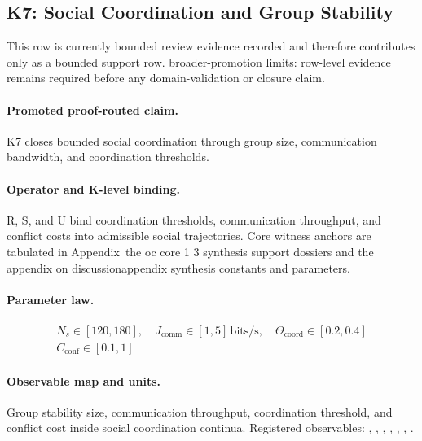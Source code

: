 \subsection{K7: Social Coordination and Group Stability}
\label{sec:oc-core-1-3-synthesis-k7}
This row is currently bounded review evidence recorded and therefore contributes only as a bounded support row.
broader-promotion limits: row-level evidence remains required before any domain-validation or closure claim.

\paragraph{Promoted proof-routed claim.}
K7 closes bounded social coordination through group size, communication bandwidth, and coordination thresholds.

\paragraph{Operator and K-level binding.}
R, S, and U bind coordination thresholds, communication throughput, and conflict costs into admissible social trajectories.
Core witness anchors are tabulated in Appendix~the oc core 1 3 synthesis support dossiers and the appendix on discussionappendix synthesis constants and parameters.

\paragraph{Parameter law.}
\[
\begin{gathered} N_s \in [120,180],\quad J_{\mathrm{comm}} \in [1,5]\,\mathrm{bits/s},\quad \Theta_{\mathrm{coord}} \in [0.2,0.4] \\ C_{\mathrm{conf}} \in [0.1,1] \end{gathered}
\]

\paragraph{Observable map and units.}
Group stability size, communication throughput, coordination threshold, and conflict cost inside social coordination continua.
Registered observables: , \allowbreak {}, \allowbreak {}, \allowbreak {}, \allowbreak {}, \allowbreak {}, \allowbreak {}.

